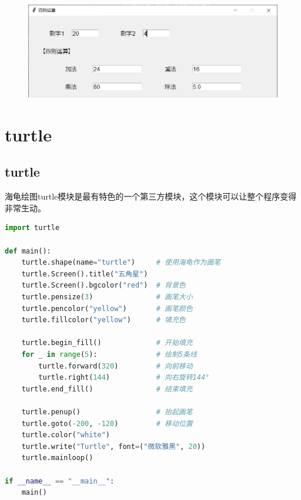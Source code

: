 \begin{tcolorbox}
	\begin{figure}[H]
		\centering
		\includegraphics[scale=0.7]{img/C13/13-5/1.png}
	\end{figure}
\end{tcolorbox}

\newpage

\section{turtle}

\subsection{turtle}

海龟绘图turtle模块是最有特色的一个第三方模块，这个模块可以让整个程序变得非常生动。\\


\begin{lstlisting}[language=Python]
import turtle

def main():
    turtle.shape(name="turtle")     # 使用海龟作为画笔
    turtle.Screen().title("五角星")
    turtle.Screen().bgcolor("red")  # 背景色
    turtle.pensize(3)               # 画笔大小
    turtle.pencolor("yellow")       # 画笔颜色
    turtle.fillcolor("yellow")      # 填充色

    turtle.begin_fill()             # 开始填充
    for _ in range(5):              # 绘制5条线
        turtle.forward(320)         # 向前移动
        turtle.right(144)           # 向右旋转144°
    turtle.end_fill()               # 结束填充

    turtle.penup()                  # 抬起画笔
    turtle.goto(-200, -120)         # 移动位置
    turtle.color("white")
    turtle.write("Turtle", font=("微软雅黑", 20))
    turtle.mainloop()

if __name__ == "__main__":
    main()
\end{lstlisting}

